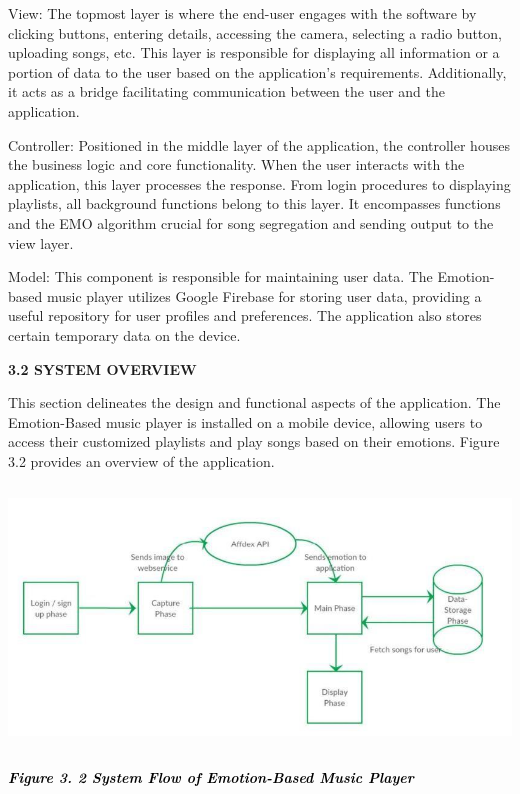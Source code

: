 \documentclass[a4paper]{article}
\begin{document}
View: The topmost layer is where the end-user engages with the software by clicking buttons, entering details, accessing
the camera, selecting a radio button, uploading songs, etc. This layer is responsible for displaying all information or
a portion of data to the user based on the application's requirements. Additionally, it acts as a bridge facilitating
communication between the user and the application.

Controller: Positioned in the middle layer of the application, the controller houses the business logic and core
functionality. When the user interacts with the application, this layer processes the response. From login procedures
to displaying playlists, all background functions belong to this layer. It encompasses functions and the EMO algorithm
crucial for song segregation and sending output to the view layer.

Model: This component is responsible for maintaining user data. The Emotion-based music player utilizes Google Firebase
for storing user data, providing a useful repository for user profiles and preferences. The application also stores
certain temporary data on the device.

{\bfseries
\hypertarget{26in1rg}{}3.2 SYSTEM OVERVIEW}

This section delineates the design and functional aspects of the application. The Emotion-Based music player is
installed on a mobile device, allowing users to access their customized playlists and play songs based on their
emotions. Figure 3.2 provides an overview of the application.

 \includegraphics[width=6.2681in,height=2.7453in]{rahulop-img005.jpg} 

{\centering
\hypertarget{lnxbz9}{}\textbf{\textit{\textcolor{black}{Figure 3. 2 System Flow of Emotion-Based Music Player}}}
\par}
\end{document}
